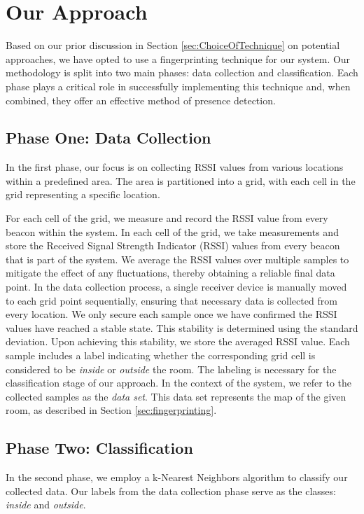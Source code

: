 \section{Our Approach}\label{sec:our_approach}
Based on our prior discussion in Section \ref{sec:ChoiceOfTechnique} on potential approaches, we have opted to use a fingerprinting technique for our system.
Our methodology is split into two main phases: data collection and classification.
Each phase plays a critical role in successfully implementing this technique and, when combined, they offer an effective method of presence detection.

\subsection{Phase One: Data Collection}\label{sec:phase1_data_collection}
In the first phase, our focus is on collecting RSSI values from various locations within a predefined area. The area is partitioned into a grid, with each cell in the grid representing a specific location. 

For each cell of the grid, we measure and record the RSSI value from every beacon within the system.
In each cell of the grid, we take measurements and store the Received Signal Strength Indicator (RSSI) values from every beacon that is part of the system. 
We average the RSSI values over multiple samples to mitigate the effect of any fluctuations, thereby obtaining a reliable final data point. 
In the data collection process, a single receiver device is manually moved to each grid point sequentially, ensuring that necessary data is collected from every location.
We only secure each sample once we have confirmed the RSSI values have reached a stable state. This stability is determined using the standard deviation.
Upon achieving this stability, we store the averaged RSSI value.
Each sample includes a label indicating whether the corresponding grid cell is considered to be \textit{inside} or \textit{outside} the room.
The labeling is necessary for the classification stage of our approach.
In the context of the system, we refer to the collected samples as the \textit{data set}.
This data set represents the map of the given room, as described in Section \ref{sec:fingerprinting}.


\subsection{Phase Two: Classification}\label{sec:phase2_classification}
In the second phase, we employ a k-Nearest Neighbors algorithm to classify our collected data. Our labels from the data collection phase serve as the classes: \textit{inside} and \textit{outside}.

